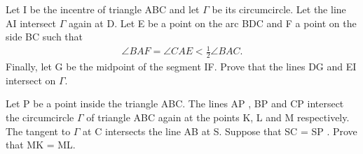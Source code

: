 \item Let I be the incentre of triangle ABC and let $\Gamma$ be its circumcircle. Let the line AI intersect
$\Gamma$ again at D. Let E be a point on the arc BDC and F a point on the side BC such that
\begin{align*}
\angle BAF = \angle CAE <\frac{1}{2}\angle BAC.
\end{align*}
Finally, let G be the midpoint of the segment IF. Prove that the lines DG and EI intersect on $\Gamma$.

\item Let P be a point inside the triangle ABC. The lines AP , BP and CP intersect the circumcircle $\Gamma$ of triangle ABC again at the points K, L and M respectively. The tangent to $\Gamma$ at C intersects the line AB at S. Suppose that SC = SP . Prove that MK = ML.
